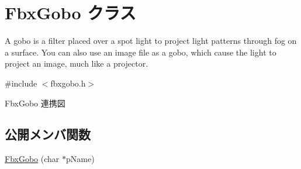 \hypertarget{class_fbx_gobo}{}\section{Fbx\+Gobo クラス}
\label{class_fbx_gobo}


A gobo is a filter placed over a spot light to project light patterns through fog on a surface. You can also use an image file as a gobo, which cause the light to project an image, much like a projector.  




{\ttfamily \#include $<$fbxgobo.\+h$>$}



Fbx\+Gobo 連携図
\subsection*{公開メンバ関数}
\begin{DoxyCompactItemize}
\item 
\hyperlink{class_fbx_gobo_a2f7f2ac035e00dcc2b89b70b3d317b01}{Fbx\+Gobo} (char $\ast$p\+Name)
\end{DoxyCompactItemize}
